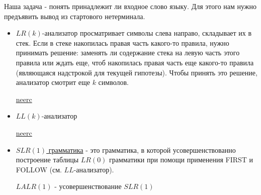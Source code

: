 Наша задача - понять принадлежит ли входное слово языку. Для этого нам нужно предъявить вывод из стартового нетерминала. 
\begin{itemize}
	\item $LR(k)$-анализатор просматривает символы слева направо, складывает их в стек. Если в стеке накопилась правая часть какого-то правила, нужно принимать решение: заменять ли содержание стека на левую часть этого правила или ждать еще, чтоб накопилась правая часть еще какого-то правила (являющаяся надстрокой для текущей гипотезы). Чтобы принять это решение, анализатор смотрит еще $k$ символов.
	
	\href{https://neerc.ifmo.ru/wiki/index.php?title=LR(k)-%D0%B3%D1%80%D0%B0%D0%BC%D0%BC%D0%B0%D1%82%D0%B8%D0%BA%D0%B8}{neerc}
	
	\item $LL(k)$-анализатор
	
	\href{https://neerc.ifmo.ru/wiki/index.php?title=LL(k)-%D0%B3%D1%80%D0%B0%D0%BC%D0%BC%D0%B0%D1%82%D0%B8%D0%BA%D0%B8,_%D0%BC%D0%BD%D0%BE%D0%B6%D0%B5%D1%81%D1%82%D0%B2%D0%B0_FIRST_%D0%B8_FOLLOW}{neerc}
	
	\item \href{https://ru.wikipedia.org/wiki/SLR(1)}{$SLR(1)$ грамматика} - это грамматика, в которой усовершенствованно построение таблицы $LR(0)$ грамматики при помощи применения FIRST и FOLLOW (см. $LL$-анализатор).
	
	\href{https://ru.wikipedia.org/wiki/LALR(1)}{$LALR(1)$} - усовершенствование $SLR(1)$
\end{itemize}
